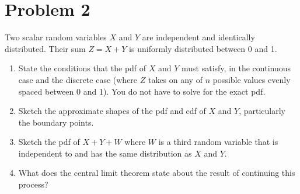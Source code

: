 \section*{Problem 2}

Two scalar random variables $X$ and $Y$ are independent and identically distributed. Their sum $Z = X + Y$ is uniformly distributed between 0 and 1.

\begin{enumerate}
    \item
    State the conditions that the pdf of $X$ and $Y$ must satisfy, in the continuous case and the discrete case (where $Z$ takes on any of $n$ possible values evenly spaced between 0 and 1). You do not have to solve for the exact pdf.
    
    \item
    Sketch the approximate shapes of the pdf and cdf of $X$ and $Y$, particularly the boundary points.

    \item
    Sketch the pdf of $X + Y + W$ where $W$ is a third random variable that is independent to and has the same distribution as $X$ and $Y$.

    \item
    What does the central limit theorem state about the result of continuing this process?
    
\end{enumerate}
